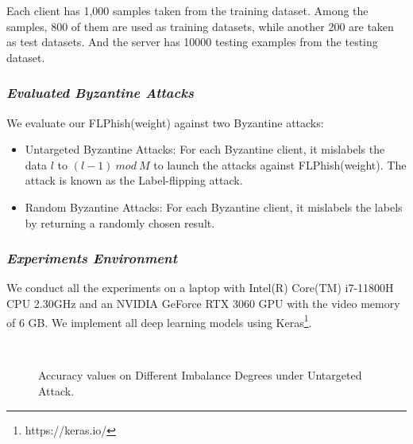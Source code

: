 \documentclass[journal]{IEEEtran}
\begin{document}
  \par Each client has 1,000 samples taken from the training dataset. Among the samples, 800 of them are used as training datasets, while another 200 are taken as test datasets. And the server has 10000 testing examples from the testing dataset. 
  \subsubsection{\textit{Evaluated Byzantine Attacks}} We evaluate our FLPhish(weight) against two Byzantine attacks:
  \begin{itemize}
    \item Untargeted Byzantine Attacks: For each Byzantine client, it mislabels the data $l$ to $(l-1)\ mod\ M$ to launch the attacks against FLPhish(weight). The attack is known as the Label-flipping attack. 
    \item Random Byzantine Attacks: For each Byzantine client, it mislabels the labels by returning a randomly chosen result.
    \end{itemize}

  
  \subsubsection{{\textit{Experiments Environment}}} We conduct all the experiments on a laptop with Intel(R) Core(TM) i7-11800H CPU 2.30GHz and an NVIDIA GeForce RTX 3060 GPU with the video memory of 6 GB. We implement all deep learning models using Keras\footnote{https://keras.io/}.



  \begin{figure}[!htp]
    \centering
    \\
    \caption{Accuracy values on Different Imbalance Degrees under Untargeted Attack.}
    \label{fig_table_imbalances_untargeted}
  \end{figure}
\end{document}
